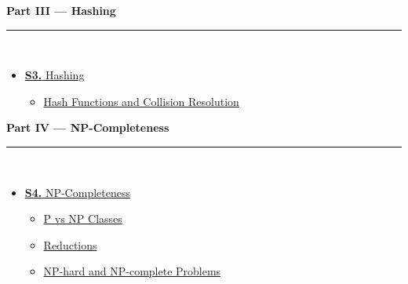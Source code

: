 \documentclass[12pt,a3paper]{article}
\begin{document}
\begin{tcolorbox}[breakable,colback=cC!5,colframe=cC,boxrule=1pt,arc=5pt,
  left=8pt,right=8pt,top=8pt,bottom=8pt,before skip=4pt]
  {\large\bfseries\textcolor{cC}{Part III --- Hashing}}\\[5pt]
  \textcolor{cC!40}{\rule{\textwidth}{0.4pt}}\\[3pt]
  \small\begin{itemize}[leftmargin=1.2em,itemsep=1pt,label={\textcolor{cC}{$\triangleright$}}]
    \item \hyperref[sec:S3]{\textbf{S3.} Hashing}
      \begin{itemize}[leftmargin=1.5em,itemsep=0pt,label={\textcolor{cC}{$\cdot$}}]
        \item \hyperref[sub:s3-hash]{Hash Functions and Collision Resolution}
      \end{itemize}
  \end{itemize}
\end{tcolorbox}

\begin{tcolorbox}[breakable,colback=cD!5,colframe=cD,boxrule=1pt,arc=5pt,
  left=8pt,right=8pt,top=8pt,bottom=8pt,before skip=4pt]
  {\large\bfseries\textcolor{cD}{Part IV --- NP-Completeness}}\\[5pt]
  \textcolor{cD!40}{\rule{\textwidth}{0.4pt}}\\[3pt]
  \small\begin{itemize}[leftmargin=1.2em,itemsep=1pt,label={\textcolor{cD}{$\triangleright$}}]
    \item \hyperref[sec:S4]{\textbf{S4.} NP-Completeness}
      \begin{itemize}[leftmargin=1.5em,itemsep=0pt,label={\textcolor{cD}{$\cdot$}}]
        \item \hyperref[sub:s4-pvsnp]{P vs NP Classes}
        \item \hyperref[sub:s4-reductions]{Reductions}
        \item \hyperref[sub:s4-nphard]{NP-hard and NP-complete Problems}
      \end{itemize}
  \end{itemize}
\end{tcolorbox}
\end{document}
